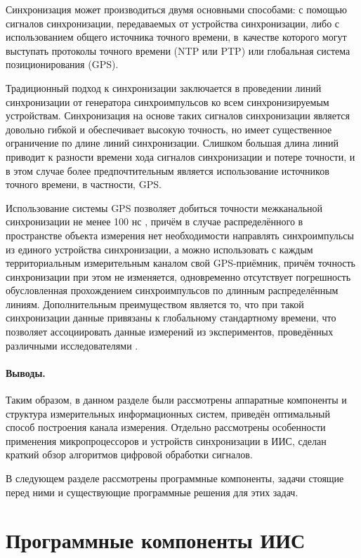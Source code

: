 \documentclass[a4paper, 14pt, titlepage]{extarticle}
\let\oldsection\section
\renewcommand{\section}{\newpage\oldsection}
\let\oldparagraph\paragraph
\renewcommand{\paragraph}[1]{\oldparagraph{\indent #1}}
\begin{document}
  Синхронизация может производиться двумя основными способами: с помощью сигналов синхронизации,
  передаваемых от устройства синхронизации, либо с использованием общего источника точного времени,
  в~качестве которого могут выступать протоколы точного времени (NTP или PTP) или глобальная система
  позиционирования (GPS).

  Традиционный подход к синхронизации заключается в проведении линий синхронизации от генератора
  синхроимпульсов ко всем синхронизируемым устройствам. Синхронизация на основе таких сигналов
  синхронизации является довольно гибкой и обеспечивает высокую точность, но имеет существенное
  ограничение по длине линий синхронизации. Слишком большая длина линий приводит к разности времени
  хода сигналов синхронизации и потере точности, и в этом случае более предпочтительным является
  использование источников точного времени, в частности, GPS.

  Использование системы GPS
  позволяет добиться точности межканальной синхронизации не менее 100 нс \cite{lombardi-gps}, причём в случае
  распределённого в пространстве объекта измерения нет необходимости направлять синхроимпульсы из
  единого устройства синхронизации, а можно использовать с каждым территориальным измерительным
  каналом свой GPS-приёмник, причём точность синхронизации при этом не изменяется,
  одновременно отсутствует погрешность обусловленная прохождением синхроимпульсов по длинным
  распределённым линиям. Дополнительным преимуществом является то, что при такой синхронизации
  данные привязаны к глобальному стандартному времени, что позволяет ассоциировать данные измерений
  из экспериментов, проведённых различными исследователями \cite{veggeberg-sync}.

  \paragraph{Выводы.}
  Таким образом, в данном разделе были рассмотрены аппаратные компоненты и структура измерительных
  информационных систем, приведён оптимальный способ построения канала измерения. Отдельно
  рассмотрены особенности применения микропроцессоров и устройств синхронизации в ИИС, сделан
  краткий обзор алгоритмов цифровой обработки сигналов.

  В следующем разделе рассмотрены программные компоненты, задачи стоящие перед ними и существующие
  программные решения для этих задач.

  \section{Программные компоненты ИИС}
\end{document}
